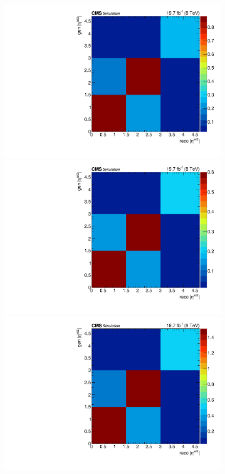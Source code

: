\begin{figure}[hbtp]
  \begin{center}
    \includegraphics[width=\cmsFigWidth]{Figures/ResMat_qqggJJ_EtaJet2_ZZTo4m_st_01_fr_Mad}
    \includegraphics[width=\cmsFigWidth]{Figures/ResMat_qqggJJ_EtaJet2_ZZTo4e_st_01_fr_Mad}
    \includegraphics[width=\cmsFigWidth]{Figures/ResMat_qqggJJ_EtaJet2_ZZTo2e2m_st_01_fr_Mad}     

\end{center}
\end{figure}
